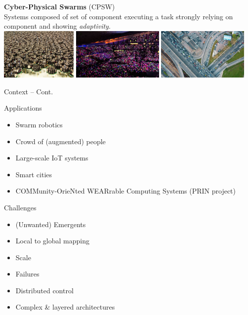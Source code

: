 \documentclass[presentation, 9pt,169]{beamer}\mode<presentation>{\usetheme{AMSBolognaFC}}
\begin{document}
  \begin{frame}[plain,c]
    \begin{center}
    {\Huge \textbf{Cyber-Physical Swarms} (CPSW)}\\
    {\large Systems composed of  set of component executing a  task strongly relying on component  and showing  \emph{adaptivity}.}\\[0.3cm]
    \includegraphics[width=0.28\textwidth]{img/swarms.jpg}
    \includegraphics[width=0.333\textwidth]{img/coldplay.jpg}
    \includegraphics[width=0.333\textwidth]{img/traffic.jpg}	
    \end{center}
  \end{frame}
\begin{frame}{Context -- Cont.}
\begin{alertblock}{Applications}
  \begin{multicols}{3}
    \begin{itemize}
      \item Swarm robotics
      \item Crowd of (augmented) people
      \item Large-scale IoT systems
      \item Smart cities
      \item COMMunity-OrieNted WEARrable Computing Systems (PRIN project)
    \end{itemize}
  \end{multicols}
\end{alertblock}

\begin{block}{Challenges}
  \begin{multicols}{3}
    \begin{itemize}
      \item (Unwanted) Emergents
      \item Local to global mapping
      \item Scale
      \item Failures
      \item Distributed control
      \item Complex \& layered architectures
    \end{itemize}
  \end{multicols}
\end{block}
\centering
\end{frame}
\end{document}
